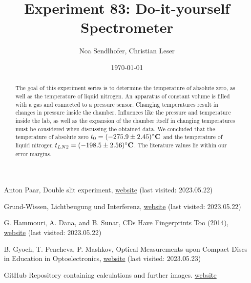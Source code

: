 \documentclass[12pt,a4paper]{article}
\title{Experiment 83: Do-it-yourself Spectrometer}
\author{Noa Sendlhofer, Christian Leser}
\date{\today}
\begin{document}
\maketitle

\begin{abstract}
    The goal of this experiment series is to determine the temperature of absolute zero, 
    as well as the temperature of liquid nitrogen. An apparatus of constant volume is filled with a gas
    and connected to a pressure sensor. Changing temperatures result in changes in pressure inside the chamber.
    Influences like the pressure and temperature inside the lab, as well as the expansion of the chamber itself
    in changing temperatures must be considered when discussing the obtained data. We concluded that the temperature
    of absolute zero $t_0 = (-275.9 \pm 2.45)\si{\bf\celsius}$ and the temperature of liquid nitrogen $t_{LN2} = (-198.5 \pm 2.56)\si{\bf\celsius}$.
    The literature values lie within our error margins.

\end{abstract}

\tableofcontents









\begin{thebibliography}{99}

Anton Paar, Double slit experiment, \href{https://wiki.anton-paar.com/ch-de/doppelspaltexperiment/}{website} (last visited: 2023.05.22)

Grund-Wissen, Lichtbeugung und Interferenz, \href{https://www.grund-wissen.de/physik/optik/wellenoptik.html}{website} (last visited: 2023.05.22)

G. Hammouri, A. Dana, and B. Sunar, CDs Have Fingerprints Too (2014), \href{https://www.researchgate.net/figure/Lands-and-pits-image-using-a-scanning-electron-microscope_fig3_221291847}{website} (last visited: 2023.05.22)

B. Gyoch, T. Pencheva, P. Mashkov, Optical Measurements upon Compact Discs in Education in Optoelectronics, \href{https://ieeexplore.ieee.org/stamp/stamp.jsp?tp=&arnumber=5547333&tag=1}{website} (last visited: 2023.05.23)

GitHub Repository containing calculations and further images. \href{https://github.com/Noothless/Physik-Absolute-Zero}{website}

\end{thebibliography}
\end{document}
